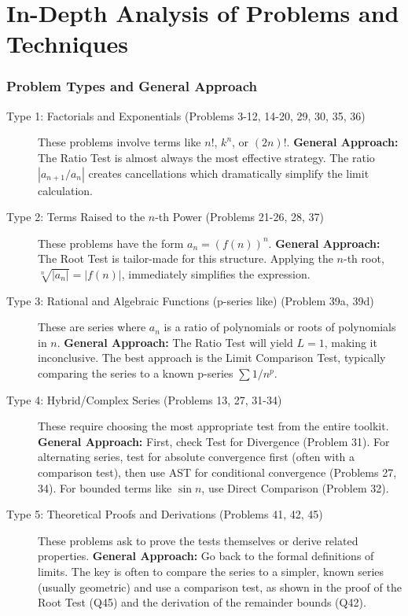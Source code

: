 \documentclass{article}
\begin{document}
\part{In-Depth Analysis of Problems and Techniques}
\section{Problem Types and General Approach}
\begin{description}
    \item[Type 1: Factorials and Exponentials (Problems 3-12, 14-20, 29, 30, 35, 36)]
    These problems involve terms like $n!$, $k^n$, or $(2n)!$.
    \textbf{General Approach:} The Ratio Test is almost always the most effective strategy. The ratio $|a_{n+1}/a_n|$ creates cancellations which dramatically simplify the limit calculation.

    \item[Type 2: Terms Raised to the $n$-th Power (Problems 21-26, 28, 37)]
    These problems have the form $a_n = (f(n))^n$.
    \textbf{General Approach:} The Root Test is tailor-made for this structure. Applying the $n$-th root, $\sqrt[n]{|a_n|} = |f(n)|$, immediately simplifies the expression.

    \item[Type 3: Rational and Algebraic Functions (p-series like) (Problem 39a, 39d)]
    These are series where $a_n$ is a ratio of polynomials or roots of polynomials in $n$.
    \textbf{General Approach:} The Ratio Test will yield $L=1$, making it inconclusive. The best approach is the Limit Comparison Test, typically comparing the series to a known p-series $\sum 1/n^p$.

    \item[Type 4: Hybrid/Complex Series (Problems 13, 27, 31-34)]
    These require choosing the most appropriate test from the entire toolkit.
    \textbf{General Approach:} First, check Test for Divergence (Problem 31). For alternating series, test for absolute convergence first (often with a comparison test), then use AST for conditional convergence (Problems 27, 34). For bounded terms like $\sin n$, use Direct Comparison (Problem 32).

    \item[Type 5: Theoretical Proofs and Derivations (Problems 41, 42, 45)]
    These problems ask to prove the tests themselves or derive related properties.
    \textbf{General Approach:} Go back to the formal definitions of limits. The key is often to compare the series to a simpler, known series (usually geometric) and use a comparison test, as shown in the proof of the Root Test (Q45) and the derivation of the remainder bounds (Q42).


\end{description}
\end{document}
